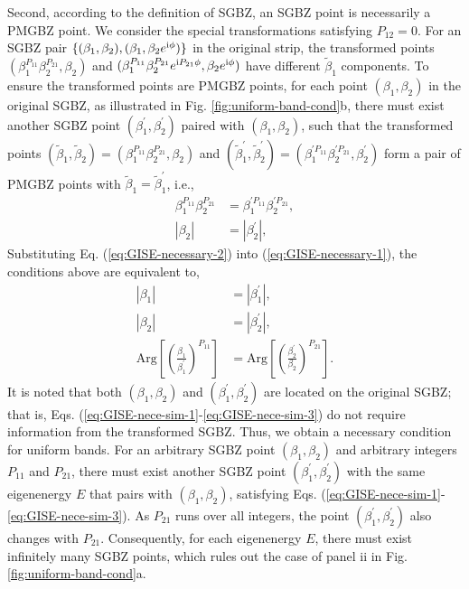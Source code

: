 \documentclass[pdflatex,sn-nature, iicol]{sn-jnl}%
\theoremstyle{thmstyleone}%
\theoremstyle{thmstyletwo}%
\theoremstyle{thmstylethree}%
\begin{document}
Second, according to the definition of SGBZ, an SGBZ point is necessarily
a PMGBZ point. We consider the special transformations satisfying
$P_{12}=0$. For an SGBZ pair $\{(\beta_{1},\beta_{2}),(\beta_{1},\beta_{2}e^{\mathrm{i}\phi})\}$
in the original strip, the transformed points $(\beta_{1}^{P_{11}}\beta_{2}^{P_{21}},\beta_{2})$
and $(\beta_{1}^{P_{11}}\beta_{2}^{P_{21}}e^{\mathrm{i} P_{21}\phi},\beta_{2}e^{\mathrm{i}\phi})$
have different $\tilde{\beta}_{1}$ components. To ensure the transformed
points are PMGBZ points, for each point $(\beta_{1},\beta_{2})$ in
the original SGBZ, as illustrated in Fig. \ref{fig:uniform-band-cond}b,
there must exist another SGBZ point $(\beta_{1}^{\prime},\beta_{2}^{\prime})$
paired with $(\beta_{1},\beta_{2})$, such that the transformed points
$\left(\tilde{\beta}_{1},\tilde{\beta}_{2}\right)=\left(\beta_{1}^{P_{11}}\beta_{2}^{P_{21}},\beta_{2}\right)$
and $\left(\tilde{\beta}_{1}^{\prime},\tilde{\beta}_{2}^{\prime}\right)=\left(\beta_{1}^{\prime P_{11}}\beta_{2}^{\prime P_{21}},\beta_{2}^{\prime}\right)$
form a pair of PMGBZ points with $\tilde{\beta}_{1}=\tilde{\beta}_{1}^{\prime}$,
i.e., 
\begin{align}
\beta_{1}^{P_{11}}\beta_{2}^{P_{21}} & =\beta_{1}^{\prime P_{11}}\beta_{2}^{\prime P_{21}},\label{eq:GISE-necessary-1}\\
\left|\beta_{2}\right| & =\left|\beta_{2}^{\prime}\right|,\label{eq:GISE-necessary-2}
\end{align}
Substituting Eq. (\ref{eq:GISE-necessary-2}) into (\ref{eq:GISE-necessary-1}),
the conditions above are equivalent to, 
\begin{align}
\left|\beta_{1}\right| & =\left|\beta_{1}^{\prime}\right|,\label{eq:GISE-nece-sim-1}\\
\left|\beta_{2}\right| & =\left|\beta_{2}^{\prime}\right|,\label{eq:GISE-nece-sim-2}\\
\text{Arg}\left[\left(\frac{\beta_{1}}{\beta_{1}^{\prime}}\right)^{P_{11}}\right] & =\text{Arg}\left[\left(\frac{\beta_{2}^{\prime}}{\beta_{2}}\right)^{P_{21}}\right].\label{eq:GISE-nece-sim-3}
\end{align}
It is noted that both $(\beta_{1},\beta_{2})$ and $(\beta_{1}^{\prime},\beta_{2}^{\prime})$
are located on the original SGBZ; that is, Eqs. (\ref{eq:GISE-nece-sim-1}-\ref{eq:GISE-nece-sim-3})
do not require information from the transformed SGBZ. Thus, we obtain
a necessary condition for uniform bands. For an arbitrary SGBZ point
$(\beta_{1},\beta_{2})$ and arbitrary integers $P_{11}$ and $P_{21}$,
there must exist another SGBZ point $(\beta_{1}^{\prime},\beta_{2}^{\prime})$
with the same eigenenergy $E$ that pairs with $(\beta_{1},\beta_{2})$,
satisfying Eqs. (\ref{eq:GISE-nece-sim-1}-\ref{eq:GISE-nece-sim-3}).
As $P_{21}$ runs over all integers, the point $(\beta_{1}^{\prime},\beta_{2}^{\prime})$
also changes with $P_{21}$. Consequently, for each eigenenergy $E$,
there must exist infinitely many SGBZ points, which rules out the
case of panel ii in Fig. \ref{fig:uniform-band-cond}a.
\end{document}
